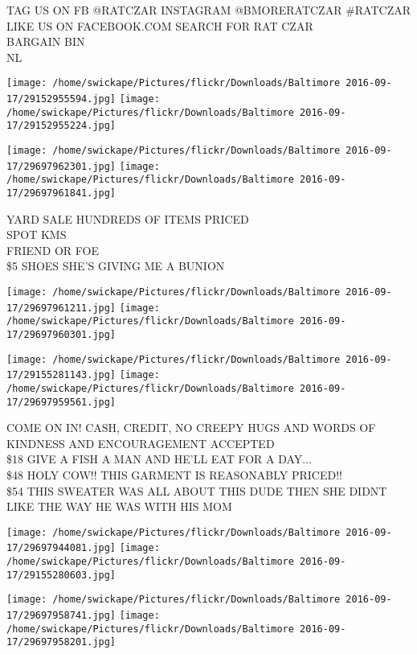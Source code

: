 \documentclass[10pt,letterpaper]{article}
\begin{document}
TAG US ON FB @RATCZAR INSTAGRAM @BMORERATCZAR \#RATCZAR\\
LIKE US ON FACEBOOK.COM SEARCH FOR RAT CZAR\\
BARGAIN BIN\\
NL
\pagebreak

\texttt{[image: /home/swickape/Pictures/flickr/Downloads/Baltimore 2016-09-17/29152955594.jpg]}
\texttt{[image: /home/swickape/Pictures/flickr/Downloads/Baltimore 2016-09-17/29152955224.jpg]}

\texttt{[image: /home/swickape/Pictures/flickr/Downloads/Baltimore 2016-09-17/29697962301.jpg]}
\texttt{[image: /home/swickape/Pictures/flickr/Downloads/Baltimore 2016-09-17/29697961841.jpg]}

YARD SALE HUNDREDS OF ITEMS PRICED\\
SPOT KMS\\
FRIEND OR FOE\\
\$5 SHOES SHE'S GIVING ME A BUNION
\pagebreak

\texttt{[image: /home/swickape/Pictures/flickr/Downloads/Baltimore 2016-09-17/29697961211.jpg]}
\texttt{[image: /home/swickape/Pictures/flickr/Downloads/Baltimore 2016-09-17/29697960301.jpg]}

\texttt{[image: /home/swickape/Pictures/flickr/Downloads/Baltimore 2016-09-17/29155281143.jpg]}
\texttt{[image: /home/swickape/Pictures/flickr/Downloads/Baltimore 2016-09-17/29697959561.jpg]}

COME ON IN!  CASH, CREDIT, NO CREEPY HUGS AND WORDS OF KINDNESS AND ENCOURAGEMENT ACCEPTED\\
\$18 GIVE A FISH A MAN AND HE'LL EAT FOR A DAY...\\
\$48 HOLY COW!! THIS GARMENT IS REASONABLY PRICED!!\\
\$54 THIS SWEATER WAS ALL ABOUT THIS DUDE THEN SHE DIDNT LIKE THE WAY HE WAS WITH HIS MOM
\pagebreak

\texttt{[image: /home/swickape/Pictures/flickr/Downloads/Baltimore 2016-09-17/29697944081.jpg]}
\texttt{[image: /home/swickape/Pictures/flickr/Downloads/Baltimore 2016-09-17/29155280603.jpg]}

\texttt{[image: /home/swickape/Pictures/flickr/Downloads/Baltimore 2016-09-17/29697958741.jpg]}
\texttt{[image: /home/swickape/Pictures/flickr/Downloads/Baltimore 2016-09-17/29697958201.jpg]}
\end{document}
